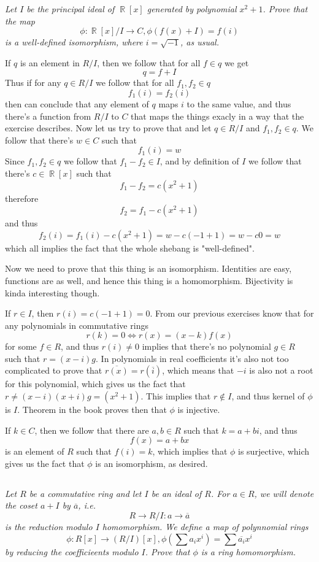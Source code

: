 \documentclass[11pt,oneside,titlepage]{book}
\DeclareMathOperator \real {\mathbb {R}}
\begin{document}
\textit{Let $I$ be the principal ideal of $\real[x]$ generated by
polynomial $x^2 + 1$. Prove that the map
  $$\phi: \real[x]/I \to C, \phi(f(x) + I) = f(i)$$
  is a well-defined isomorphism, where $i = \sqrt{-1}$, as usual.}

If $q$ is an element in $R/I$, then we follow that for all $f \in q$
we get
$$q = f + I$$
Thus if for any $q \in R/I$ we follow that for all $f_1, f_2 \in q$
$$f_1(i) = f_2(i)$$
then can conclude that any element of $q$ maps $i$ to the same value,
and thus there's a function from $R/I$ to $C$ that maps the things
exacly in a way that the exercise describes. Now let us try to prove
that and let $q \in R/I$ and $f_1, f_2 \in q$. We follow that there's
$w \in C$ such that
$$f_1(i) = w$$
Since $f_1, f_2 \in q$ we follow that $f_1 - f_2 \in I$, and by
definition of $I$ we follow that there's $c \in \real[x]$ such that
$$f_1 - f_2 = c(x^2 + 1)$$
therefore
$$f_2 = f_1 - c(x^2 + 1)$$
and thus
$$f_2(i) = f_1(i) - c(x^2 + 1) = w - c(-1 + 1) = w - c0 = w$$
which all implies the fact that the whole shebang is "well-defined".

Now we need to prove that this thing is an isomorphism. Identities are
easy, functions are as well, and hence this thing is a
homomorphism. Bijectivity is kinda interesting though.

If $r \in I$, then $r(i) = c(-1 + 1) = 0$. From our previous exercises
know that for any polynomials in commutative rings
$$r(k) = 0 \iff r(x) = (x - k)f(x)$$
for some $f \in R$, and thus $r(i) \neq 0$ implies that there's no
polynomial $g \in R$ such that $r = (x - i) g$. In polynomials in real
coefficients it's also not too complicated to prove that
$\overline{r(x)} = r(\overline{i})$, which means that $-i$ is also not
a root for this polynomial, which gives us the fact that $r \neq (x -
i) (x + i) g = (x^2 + 1)$.  This implies that $r \notin I$, and thus
kernel of $\phi$ is $I$. Theorem in the book proves then that $\phi$
is injective.

If $k \in C$, then we follow that there are $a, b \in R$ such that $k
= a + bi$, and thus
$$f(x) = a + bx$$
is an element of $R$ such that $f(i) = k$, which implies that $\phi$
is surjective, which gives us the fact that $\phi$ is an isomorphism,
as desired.

\subsection{}

\textit{Let $R$ be a commutative ring and let $I$ be an ideal of
$R$. For $a \in R$, we will denote the coset $a + I$ by
$\overline{a}$, i.e.
  $$R \to R/I: a \to \overline{a}$$
  is the reduction modulo $I$ homomorphism. We define a map of
polynnomial rings
  $$\phi: R[x] \to (R/I)[x], \phi(\sum {a_i x^i}) = \sum {\overline{a_i} x^i}$$
  by reducing the coefficieents modulo $I$. Prove that $\phi$ is a
ring homomorphism.}
\end{document}
